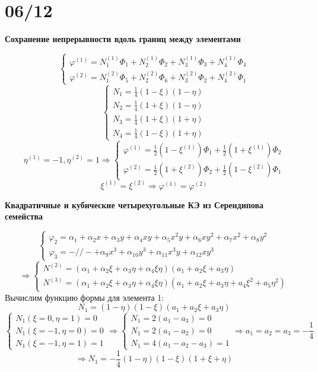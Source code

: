 \documentclass{bmstu}
\begin{document}
	\section*{06/12}
	\begin{center}
		\textbf{Сохранение непрерывности вдоль границ между элементами}
	\end{center}

\[
\begin{cases}
	\varphi^{(1)}=N_1^{(1)}\Phi_1+N_2^{(1)}\Phi_2+N_3^{(1)}\Phi_3+N_4^{(1)}\Phi_4 \\
	\varphi^{(2)}=N_1^{(2)}\Phi_5+N_2^{(2)}\Phi_6+N_3^{(2)}\Phi_2+N_4^{(2)}\Phi_1
\end{cases}
\]
\[
	\begin{cases}
	N_1=\frac{1}{4}(1-\xi)(1-\eta) \\
	N_2=\frac{1}{4}(1+\xi)(1-\eta) \\
	N_3=\frac{1}{4}(1+\xi)(1+\eta) \\
	N_4=\frac{1}{4}(1-\xi)(1+\eta)
	\end{cases} 
\]
\[
 \eta^{(1)}=-1, \eta^{(2)}=1  \Rightarrow  \begin{cases}
 	\varphi^{(1)}=\frac{1}{2}(1-\xi^{(1)})\Phi_1 + \frac{1}{2}(1+\xi^{(1)})\Phi_2 \\
 	\varphi^{(2)}=\frac{1}{2}(1+\xi^{(2)})\Phi_2 + \frac{1}{2}(1-\xi^{(2)})\Phi_1
 \end{cases}
\]
\[
	\xi^{(1)}=\xi^{(2)} \Rightarrow \varphi^{(1)}=\varphi^{(2)}
\]

\begin{center}
	\textbf{Квадратичные и кубические четырехугольные КЭ из Серендипова семейства}
\end{center}
\[
\begin{cases}
\varphi_2=\alpha_1+\alpha_2x+\alpha_3y+\alpha_4xy+\alpha_5x^2y+\alpha_6xy^2+\alpha_7x^2+\alpha_8y^2 \\
\varphi_3= -//- +\alpha_9x^3+\alpha_{10}y^3+\alpha_{11}x^3y+\alpha_{12}xy^3
\end{cases}
\]
\[
\Rightarrow
\begin{cases}
	N^{(2)}=(\alpha_1+\alpha_2\xi+\alpha_3\eta+\alpha_4\xi\eta)(a_1+a_2\xi+a_3\eta) \\
	N^{(3)}=(\alpha_1+\alpha_2\xi+\alpha_3\eta+\alpha_4\xi\eta)(a_1+a_2\xi+a_3\eta+a_4\xi^2+a_5\eta^2)
\end{cases}
\]
Вычислим функцию формы для элемента 1:
\[
	N_1=(1-\eta)(1-\xi)(a_1+a_2\xi+a_3\eta) 
\]
\[ \begin{cases}
	N_1(\xi=0, \eta=1)=0 \\
	N_1(\xi=-1, \eta=0) =0 \\
	N_1(\xi=-1, \eta=1) = 1 \end{cases} \Rightarrow \begin{cases} N_1=2(a_1-a_3)=0 \\ N_1=2(a_1-a_2)=0 \\ N_1 = 4(a_1-a_2-a_3)=1  \end{cases} \Rightarrow a_1=a_2=a_3=-\frac{1}{4} 
\]
\[
	\Rightarrow N_1=-\frac{1}{4}(1-\eta)(1-\xi)(1+\xi+\eta) 
\]
\end{document}

